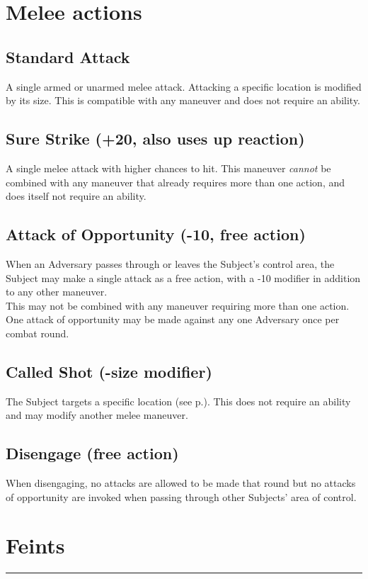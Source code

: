 \pagebreak %
\section{Melee actions}
\subsection*{Standard Attack}
A single armed or unarmed melee attack. Attacking a specific location is modified by its size. This is compatible with any maneuver and does not require an ability.
\subsection*{Sure Strike (+20, also uses up reaction)}
A single melee attack with higher chances to hit.
This maneuver \emph{cannot} be combined with any maneuver that already requires more than one action,
	and does itself not require an ability.
\subsection*{Attack of Opportunity (-10, free action)}
When an Adversary passes through or leaves the Subject’s control area,
	the Subject may make a single attack as a free action,
	with a -10 modifier in addition to any other maneuver.\\
This may not be combined with any maneuver requiring more than one action.\\
One attack of opportunity may be made against any one Adversary once per combat round.
\subsection*{Called Shot (-size modifier)}
The Subject targets a specific location (see p.\pageref{sizestable}).
This does not require an ability and may modify another melee maneuver.
\subsection*{Disengage (free action)}
\label{action:disengage}
When disengaging, no attacks are allowed to be made that round but no attacks of opportunity are invoked when passing through other Subjects' area of control.

\section*{Feints}
\hrule
